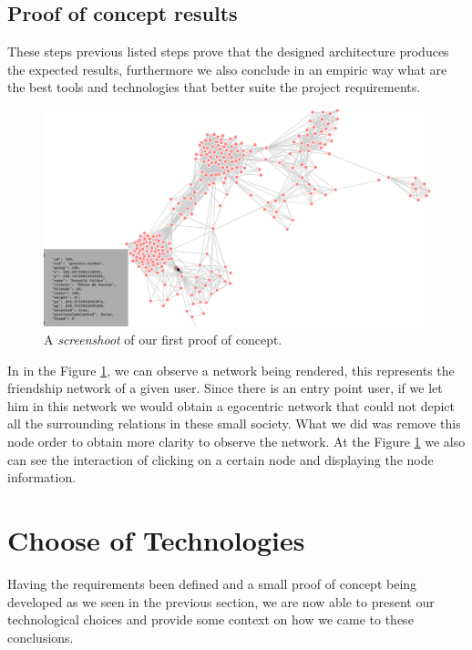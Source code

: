 \subsection{Proof of concept results}
\indent These steps previous listed steps prove that the designed architecture produces the expected results, furthermore we also conclude in an empiric way what are
the best tools and technologies that better suite the project requirements.\\

\begin{figure}[h!]
\begin{center}
  \hspace*{-0.8in}
  \includegraphics[width=1.2\textwidth]{img/proof-of-concept.png}
\end{center}
\caption{\label{img:poc} A \textit{screenshoot} of our first proof of concept.}
\end{figure}

\indent In in the Figure \ref{img:poc}, we can observe a network being rendered, this represents the friendship network of a given user. Since there is an entry point user, if we let him in this network we would obtain a egocentric network that could not depict all the surrounding relations in these small society. What we did was remove this node order to obtain more clarity to observe the network. At the Figure \ref{img:poc} we also can see the interaction of clicking on a certain node and displaying the node information.

\section{Choose of Technologies}
Having the requirements been defined and a small proof of concept being developed as we seen in the previous section, we are now able to present our technological choices and provide some context on how we came to these conclusions.

